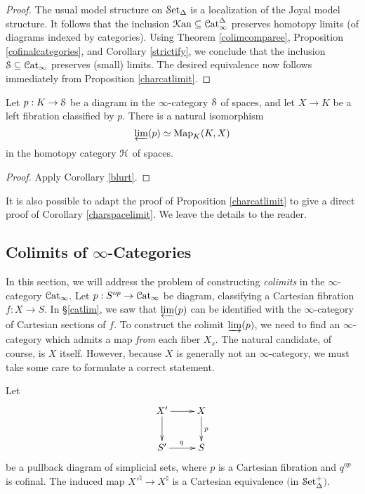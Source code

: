 \begin{proof}
The usual model structure on $\sSet$ is a localization of the Joyal model structure. It follows that the inclusion $\Kan \subseteq \Cat^{\Delta}_{\infty}$ preserves homotopy limits (of diagrams indexed by categories). Using Theorem \ref{colimcomparee}, Proposition \ref{cofinalcategories}, and Corollary \ref{strictify}, we conclude that the inclusion $\SSet \subseteq \Cat_{\infty}$ preserves (small) limits.
The desired equivalence now follows immediately from Proposition \ref{charcatlimit}.
\end{proof}

\begin{corollary}\label{needta}
Let $p: K \rightarrow \SSet$ be a diagram in the $\infty$-category $\SSet$ of spaces, and let
$X \rightarrow K$ be a left fibration classified by $p$. There
is a natural isomorphism
$$ \projlim(p) \simeq \bHom_{K}( K, X ) $$
in the homotopy category $\calH$ of spaces.
\end{corollary}

\begin{proof}
Apply Corollary \ref{blurt}.
\end{proof}

\begin{remark}
It is also possible to adapt the proof of Proposition \ref{charcatlimit} to give a direct proof of
Corollary \ref{charspacelimit}. We leave the details to the reader.
\end{remark}

\subsection{Colimits of $\infty$-Categories}\label{catcolim}

In this section, we will address the problem of constructing {\em colimits} in
the $\infty$-category $\Cat_{\infty}$. Let $p: S^{op} \rightarrow \Cat_{\infty}$ be
diagram, classifying a Cartesian fibration $f: X \rightarrow S$. In \S \ref{catlim}, we saw that
$\projlim(p)$ can be identified with the $\infty$-category of Cartesian sections of $f$. To construct the colimit $\injlim(p)$, we need to find an $\infty$-category which admits a map {\em from} each fiber $X_{s}$. The natural candidate, of course, is $X$ itself. However, because $X$ is generally not an $\infty$-category, we must take some care to formulate a correct statement.

\begin{lemma}\label{wilkins}
Let 
$$\xymatrix{
X' \ar[r] \ar[d] & X \ar[d]^{p} \\
S' \ar[r]^{q} & S }$$
be a pullback diagram of simplicial sets, where $p$ is a Cartesian fibration and
$q^{op}$ is cofinal. The induced map ${X'}^{\natural} \rightarrow X^{\natural}$ is
a Cartesian equivalence $($in $\mSet${}$)$.
\end{lemma}

